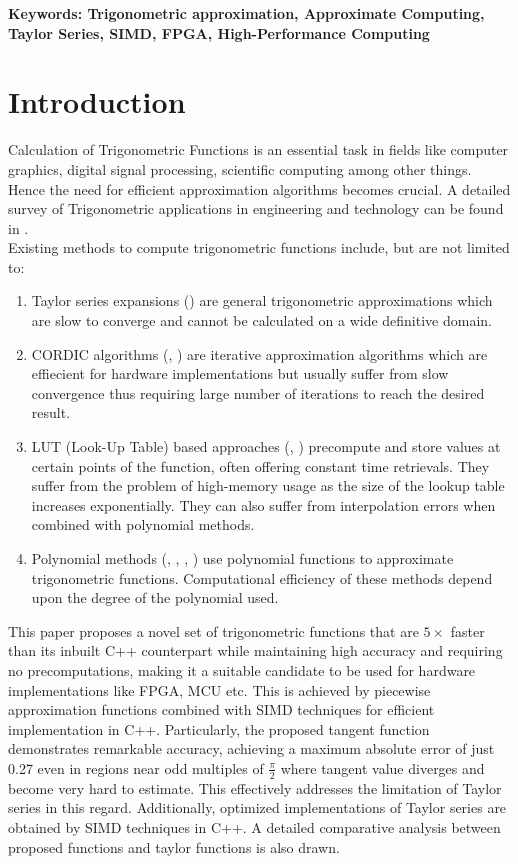 \documentclass[12pt,twoside, letterpaper, margin=1in]{article}
\begin{document}
{\small \textbf{Keywords: Trigonometric approximation, Approximate Computing, Taylor Series, SIMD, FPGA, High-Performance Computing} }


\section{Introduction}

Calculation of Trigonometric Functions is an essential task in fields like computer graphics, digital signal processing, scientific computing among other things. Hence the need for efficient approximation algorithms becomes crucial. A detailed survey of Trigonometric applications in engineering and technology can be found in \cite{r1}. \\
Existing methods to compute trigonometric functions include, but are not limited to: 
\begin{enumerate}[label=\roman*]
    \item Taylor series expansions (\cite{taylorser}) are general trigonometric approximations which are slow to converge and cannot be calculated on a wide definitive domain.
    \item CORDIC algorithms (\cite{cordic_1}, \cite{cordic_2}) are iterative approximation algorithms which are effiecient for hardware implementations but usually suffer from slow convergence thus requiring large number of iterations to reach the desired result.
    \item LUT (Look-Up Table) based approaches (\cite{lut_1}, \cite{lut_2}) precompute and store values at certain points of the function, often offering constant time retrievals. They suffer from the problem of high-memory usage as the size of the lookup table increases exponentially. They can also suffer from interpolation errors when combined with polynomial methods.
    \item Polynomial methods (\cite{poly1}, \cite{poly2}, \cite{poly3}, \cite{poly4}) use polynomial functions to approximate trigonometric functions. Computational efficiency of these methods depend upon the degree of the polynomial used.
\end{enumerate}
This paper proposes a novel set of trigonometric functions that are \(5 \times\) faster than its inbuilt C++ counterpart while maintaining high accuracy and requiring no precomputations, making it a suitable candidate to be used for hardware implementations like FPGA, MCU etc. This is achieved by piecewise approximation functions combined with SIMD techniques for efficient implementation in C++. Particularly, the proposed tangent function demonstrates remarkable accuracy, achieving a maximum absolute error of just 0.27 even in regions near odd multiples of $\frac{\pi}{2}$ where tangent value diverges and become very hard to estimate. This effectively addresses the limitation of Taylor series in this regard. Additionally, optimized implementations of Taylor series are obtained by SIMD techniques in C++. A detailed comparative analysis between proposed functions and taylor functions is also drawn. \\
\end{document}
